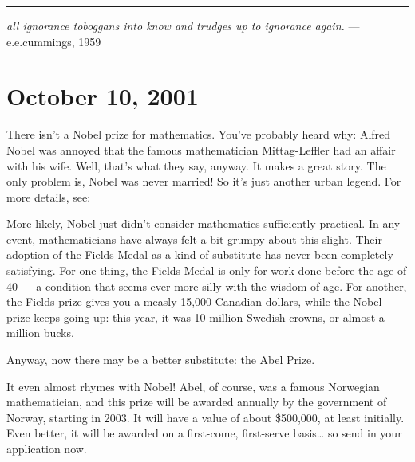 \documentclass{article}
\def\tightlist{}
\renewcommand{\texttt}[1]{%
  \begingroup
  \ttfamily
  \begingroup\lccode`~=`/\lowercase{\endgroup\def~}{/\discretionary{}{}{}}%
  \begingroup\lccode`~=`[\lowercase{\endgroup\def~}{[\discretionary{}{}{}}%
  \begingroup\lccode`~=`.\lowercase{\endgroup\def~}{.\discretionary{}{}{}}%
  \catcode`/=\active\catcode`[=\active\catcode`.=\active
  \scantokens{#1\noexpand}%
  \endgroup
}
\begin{document}
\begin{center}\rule{0.5\linewidth}{0.5pt}\end{center}

\emph{all ignorance toboggans into know and trudges up to ignorance
again.} --- e.e.cummings, 1959



\hypertarget{week171}{%
\section{October 10, 2001}\label{week171}}

There isn't a Nobel prize for mathematics. You've probably heard why:
Alfred Nobel was annoyed that the famous mathematician Mittag-Leffler
had an affair with his wife. Well, that's what they say, anyway. It
makes a great story. The only problem is, Nobel was never married! So
it's just another urban legend. For more details, see:


More likely, Nobel just didn't consider mathematics sufficiently
practical. In any event, mathematicians have always felt a bit grumpy
about this slight. Their adoption of the Fields Medal as a kind of
substitute has never been completely satisfying. For one thing, the
Fields Medal is only for work done before the age of 40 --- a condition
that seems ever more silly with the wisdom of age. For another, the
Fields prize gives you a measly 15,000 Canadian dollars, while the Nobel
prize keeps going up: this year, it was 10 million Swedish crowns, or
almost a million bucks.

Anyway, now there may be a better substitute: the Abel Prize.


It even almost rhymes with Nobel! Abel, of course, was a famous
Norwegian mathematician, and this prize will be awarded annually by the
government of Norway, starting in 2003. It will have a value of about
\$500,000, at least initially. Even better, it will be awarded on a
first-come, first-serve basis\ldots{} so send in your application now.
\end{document}
